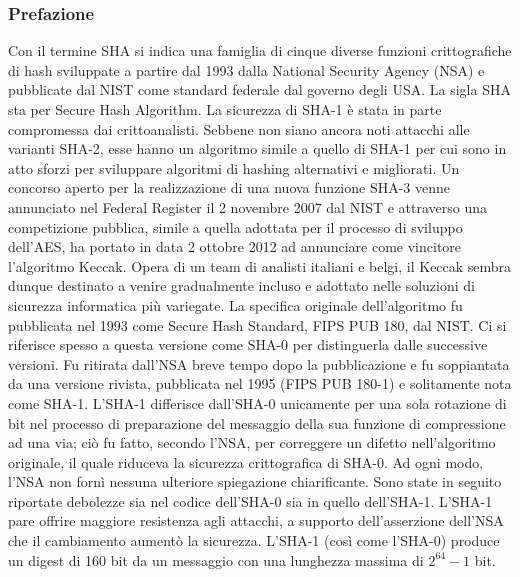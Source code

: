 \documentclass[10pt,a4paper]{article}
\begin{document}
\subsubsection{Prefazione}
Con il termine SHA si indica una famiglia di cinque diverse funzioni crittografiche di hash sviluppate a partire dal 1993 dalla National Security Agency (NSA) e pubblicate dal NIST come standard federale dal governo degli USA. La sigla SHA sta per Secure Hash Algorithm. La sicurezza di SHA-1 è stata in parte compromessa dai crittoanalisti. Sebbene non siano ancora noti attacchi alle varianti SHA-2, esse hanno un algoritmo simile a quello di SHA-1 per cui sono in atto sforzi per sviluppare algoritmi di hashing alternativi e migliorati. Un concorso aperto per la realizzazione di una nuova funzione SHA-3 venne annunciato nel Federal Register il 2 novembre 2007 dal NIST e attraverso una competizione pubblica, simile a quella adottata per il processo di sviluppo dell'AES, ha portato in data 2 ottobre 2012 ad annunciare come vincitore l'algoritmo Keccak. Opera di un team di analisti italiani e belgi, il Keccak sembra dunque destinato a venire gradualmente incluso e adottato nelle soluzioni di sicurezza informatica più variegate.
La specifica originale dell'algoritmo fu pubblicata nel 1993 come Secure Hash Standard, FIPS PUB 180, dal NIST. Ci si riferisce spesso a questa versione come SHA-0 per distinguerla dalle successive versioni. Fu ritirata dall'NSA breve tempo dopo la pubblicazione e fu soppiantata da una versione rivista, pubblicata nel 1995 (FIPS PUB 180-1) e solitamente nota come SHA-1. L'SHA-1 differisce dall'SHA-0 unicamente per una sola rotazione di bit nel processo di preparazione del messaggio della sua funzione di compressione ad una via; ciò fu fatto, secondo l'NSA, per correggere un difetto nell'algoritmo originale, il quale riduceva la sicurezza crittografica di SHA-0. Ad ogni modo, l'NSA non fornì nessuna ulteriore spiegazione chiarificante. Sono state in seguito riportate debolezze sia nel codice dell'SHA-0 sia in quello dell'SHA-1. L'SHA-1 pare offrire maggiore resistenza agli attacchi, a supporto dell'asserzione dell'NSA che il cambiamento aumentò la sicurezza.
L'SHA-1 (così come l'SHA-0) produce un digest di 160 bit da un messaggio con una lunghezza massima di $2^{64}-1$ bit.
\end{document}

